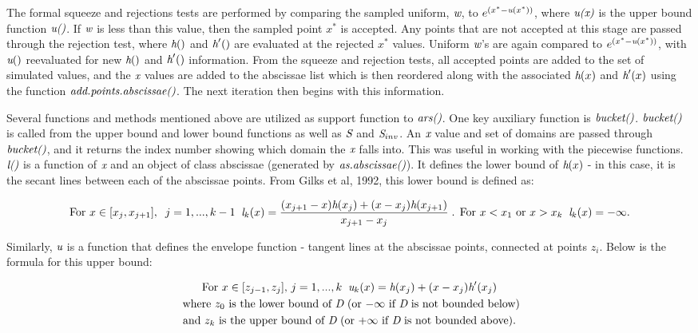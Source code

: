 \documentclass{article}\usepackage[]{graphicx}\usepackage[]{color}
\begin{document}
The formal squeeze and rejections tests are performed by comparing the sampled uniform, $\emph{w}$, to $e^{( x^{*} - \emph{u}(x^{*}) )}$, where $\emph{u(x)}$ is the upper bound function $\emph{u()}$.  If $\emph{w}$ is less than this value, then the sampled point $x^{*}$ is accepted.  Any points that are not accepted at this stage are passed through the rejection test, where $\emph{h}()$ and $\emph{h}'()$ are evaluated at the rejected $x^{*}$ values.  Uniform $\emph{w}$'s are again compared to $e^{( x^{*} - \emph{u}(x^{*}) )}$, with $\emph{u}()$ reevaluated for new $\emph{h}()$ and $\emph{h}'()$ information.  From the squeeze and rejection tests, all accepted points are added to the set of simulated values, and the $\emph{x}$ values are added to the abscissae list which is then reordered along with the associated $\emph{h}(x)$ and $\emph{h}'(x)$ using the function $\emph{add.points.abscissae()}$.  The next iteration then begins with this information.

Several functions and methods mentioned above are utilized as support function to $\emph{ars()}$.  One key auxiliary function is $\emph{bucket()}$. $\emph{bucket()}$ is called from the upper bound and lower bound functions as well as $\emph{S}$ and $\emph{S}_{inv}$.  An $\emph{x}$ value and set of domains are passed through $\emph{bucket()}$, and it returns the index number showing which domain the $\emph{x}$ falls into.  This was useful in working with the piecewise functions. $\emph{l()}$ is a function of $\emph{x}$ and an object of class abscissae (generated by $\emph{as.abscissae()}$).  It defines the lower bound of $\emph{h}(x)$ - in this case, it is the secant lines between each of the abscissae points.  From Gilks et al, 1992, this lower bound is defined as:

\begin{gather*}
\text{For } x \in [x_{j}, x_{j+1}], \; \; j = 1, ..., k-1 \; \; 
\emph{l}_{k}(x) = \frac{(x_{j+1} - x)\emph{h}(x_{j}) + (x - x_{j})\emph{h}(x_{j+1})}{x_{j+1} - x_{j}} \;
\text{. For } x < x_{1} \text{ or } x > x_{k} \; \;  \emph{l}_{k}(x) = -\infty.
\end{gather*}


Similarly, $\emph{u}$ is a function that defines the envelope function - tangent lines at the abscissae points, connected at points $z_i$.  Below is the formula for this upper bound:


\begin{gather*}
\text{For } x \in [z_{j-1}, z_{j}] \text{,  } j = 1, ..., k \; \;
\emph{u}_{k}(x) = \emph{h}(x_{j}) + (x - x_{j})\emph{h}'(x_{j}) \\
\text{ where $z_{0}$ is the lower bound of $\emph{D}$ (or $-\infty$ if $\emph{D}$ is not bounded below)} \\ \text{and $z_{k}$ is the upper bound of $\emph{D}$ (or $+\infty$ if $\emph{D}$ is not bounded above).}
\end{gather*}
\end{document}

